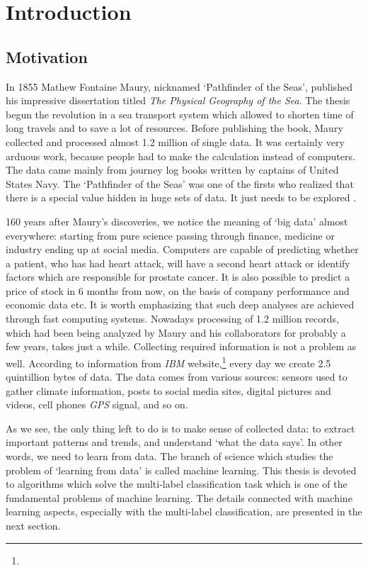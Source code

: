 
\chapter{Introduction}

\section{Motivation}

In 1855 Mathew Fontaine Maury, nicknamed `Pathfinder of the Seas', published his impressive dissertation titled \textit{The Physical Geography of the Sea}. The thesis begun the revolution in a sea transport system which allowed to shorten time of long travels and to save a lot of resources. Before publishing the book, Maury collected and processed almost 1.2 million of single data. It was certainly very arduous work, because people had to make the calculation instead of computers. The data came mainly from journey log books written by captains of United States Navy. The `Pathfinder of the Seas' was one of the firsts who realized that there is a special value hidden in huge sets of data. It just needs to be explored \citep{Data}.  

160 years after Maury's discoveries, we notice the meaning of `big data' almost everywhere: starting from pure science passing through finance, medicine or industry ending up at social media. Computers are capable of predicting whether a patient, who has had heart attack, will have a second heart attack or identify factors which are responsible for prostate cancer. It is also possible to predict a price of stock in 6 months from now, on the basis of company performance and economic data etc.
It is worth emphasizing that such deep analyses are achieved through fast computing systems. Nowadays processing of 1.2 million records, which had been being analyzed by Maury and his collaborators for probably a few years, takes just a while. Collecting required information is not a problem as well. According to information from \textit{IBM} website,\footnote{} every day we create 2.5 quintillion bytes of data. The data comes from various sources: sensors used to gather climate information, posts to social media sites, digital pictures and videos, cell phones \textit{GPS} signal, and so on.

As we see, the only thing left to do is to make sense of collected data: to extract important patterns and trends, and understand `what the data says'. In other words, we need to learn from data. The branch of science which studies the problem of `learning from data' is called machine learning. This thesis is devoted to algorithms which solve the multi-label classification task which is one of the fundamental problems of machine learning. The details connected with machine learning aspects, especially with the multi-label classification, are presented in the next section.


